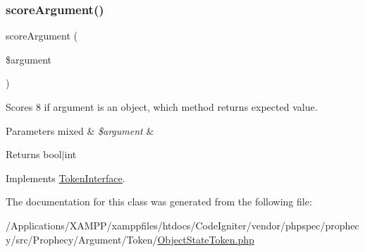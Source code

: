 \subsubsection{\texorpdfstring{score\+Argument()}{scoreArgument()}}
{\footnotesize\ttfamily score\+Argument (\begin{DoxyParamCaption}\item[{}]{\$argument }\end{DoxyParamCaption})}

Scores 8 if argument is an object, which method returns expected value.


\begin{DoxyParams}[1]{Parameters}
mixed & {\em \$argument} & \\
\hline
\end{DoxyParams}
\begin{DoxyReturn}{Returns}
bool$\vert$int 
\end{DoxyReturn}


Implements \mbox{\hyperlink{interface_prophecy_1_1_argument_1_1_token_1_1_token_interface_a8d5bf47ab6eaa935458d5ad160e52822}{Token\+Interface}}.



The documentation for this class was generated from the following file\+:\begin{DoxyCompactItemize}
\item 
/\+Applications/\+X\+A\+M\+P\+P/xamppfiles/htdocs/\+Code\+Igniter/vendor/phpspec/prophecy/src/\+Prophecy/\+Argument/\+Token/\mbox{\hyperlink{_object_state_token_8php}{Object\+State\+Token.\+php}}\end{DoxyCompactItemize}
